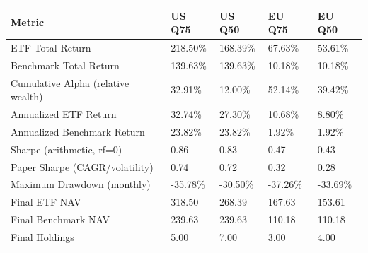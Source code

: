 \begin{longtable}{lllll}
Metric & US Q75 & US Q50 & EU Q75 & EU Q50 \\
\hline
ETF Total Return & 218.50\% & 168.39\% & 67.63\% & 53.61\% \\
Benchmark Total Return & 139.63\% & 139.63\% & 10.18\% & 10.18\% \\
Cumulative Alpha (relative wealth) & 32.91\% & 12.00\% & 52.14\% & 39.42\% \\
Annualized ETF Return & 32.74\% & 27.30\% & 10.68\% & 8.80\% \\
Annualized Benchmark Return & 23.82\% & 23.82\% & 1.92\% & 1.92\% \\
Sharpe (arithmetic, rf=0) & 0.86 & 0.83 & 0.47 & 0.43 \\
Paper Sharpe (CAGR/volatility) & 0.74 & 0.72 & 0.32 & 0.28 \\
Maximum Drawdown (monthly) & -35.78\% & -30.50\% & -37.26\% & -33.69\% \\
Final ETF NAV & 318.50 & 268.39 & 167.63 & 153.61 \\
Final Benchmark NAV & 239.63 & 239.63 & 110.18 & 110.18 \\
Final Holdings & 5.00 & 7.00 & 3.00 & 4.00 \\
\end{longtable}
